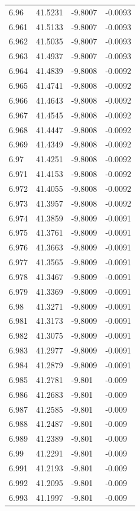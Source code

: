 \begin{tabular}{llll}
6.96 & 41.5231 & -9.8007 & -0.0093 \\
6.961 & 41.5133 & -9.8007 & -0.0093 \\
6.962 & 41.5035 & -9.8007 & -0.0093 \\
6.963 & 41.4937 & -9.8007 & -0.0093 \\
6.964 & 41.4839 & -9.8008 & -0.0092 \\
6.965 & 41.4741 & -9.8008 & -0.0092 \\
6.966 & 41.4643 & -9.8008 & -0.0092 \\
6.967 & 41.4545 & -9.8008 & -0.0092 \\
6.968 & 41.4447 & -9.8008 & -0.0092 \\
6.969 & 41.4349 & -9.8008 & -0.0092 \\
6.97 & 41.4251 & -9.8008 & -0.0092 \\
6.971 & 41.4153 & -9.8008 & -0.0092 \\
6.972 & 41.4055 & -9.8008 & -0.0092 \\
6.973 & 41.3957 & -9.8008 & -0.0092 \\
6.974 & 41.3859 & -9.8009 & -0.0091 \\
6.975 & 41.3761 & -9.8009 & -0.0091 \\
6.976 & 41.3663 & -9.8009 & -0.0091 \\
6.977 & 41.3565 & -9.8009 & -0.0091 \\
6.978 & 41.3467 & -9.8009 & -0.0091 \\
6.979 & 41.3369 & -9.8009 & -0.0091 \\
6.98 & 41.3271 & -9.8009 & -0.0091 \\
6.981 & 41.3173 & -9.8009 & -0.0091 \\
6.982 & 41.3075 & -9.8009 & -0.0091 \\
6.983 & 41.2977 & -9.8009 & -0.0091 \\
6.984 & 41.2879 & -9.8009 & -0.0091 \\
6.985 & 41.2781 & -9.801 & -0.009 \\
6.986 & 41.2683 & -9.801 & -0.009 \\
6.987 & 41.2585 & -9.801 & -0.009 \\
6.988 & 41.2487 & -9.801 & -0.009 \\
6.989 & 41.2389 & -9.801 & -0.009 \\
6.99 & 41.2291 & -9.801 & -0.009 \\
6.991 & 41.2193 & -9.801 & -0.009 \\
6.992 & 41.2095 & -9.801 & -0.009 \\
6.993 & 41.1997 & -9.801 & -0.009 \\

\end{tabular}
